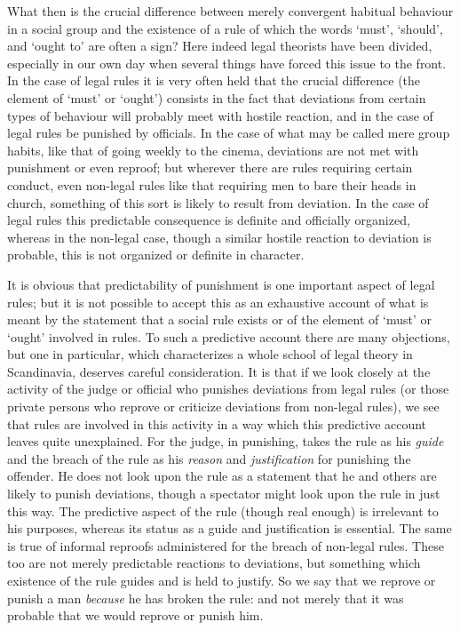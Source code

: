 What then is the crucial difference between merely convergent habitual
behaviour in a social group and the existence of a rule of which the
words `must', `should', and `ought to' are often a sign? Here indeed
legal theorists have been divided, especially in our own day when
several things have forced this issue to the front. In the case of legal
rules it is very often held that the crucial difference (the element of
`must' or `ought') consists in the fact that deviations from certain
types of behaviour will probably meet with hostile reaction, and in the
case of legal rules be punished by officials. In the case of what may be
called mere group habits, like that of going weekly to the cinema,
deviations are not met with punishment or even reproof; but wherever
there are rules requiring certain conduct, even non-legal rules like
that requiring men to bare their heads in church, something of this sort
is likely to result from deviation. In the case of legal rules this
predictable consequence is definite and officially organized, whereas in
the non-legal case, though a similar hostile reaction to deviation is
probable, this is not organized or definite in character.

It is obvious that predictability of punishment is one important aspect
of legal rules; but it is not possible to accept this as an exhaustive
account of what is meant by the statement that a social rule exists or
of the element of `must' or `ought' involved in rules. To such a
predictive account there are many objections, but one in particular,
which characterizes a whole school of legal theory in Scandinavia,
deserves careful consideration. It is that if we look closely at the
activity of the judge or official who punishes deviations from legal
rules (or those private persons who reprove or criticize deviations from
non-legal rules), we see that rules are involved in this activity in a
way which this predictive account leaves quite unexplained. For the
judge, in punishing, takes the rule as his \emph{guide} and the breach
of the rule as his \emph{reason} and \emph{justification} for punishing
the offender. He does not look upon the rule as a statement that he and
others are likely to punish deviations, though a spectator might look
upon the rule in just this way. The predictive aspect of the rule
(though real enough) is irrelevant to his purposes, whereas its status
as a guide and justification is essential. The same is true of informal
reproofs administered for the breach of non-legal rules. These too are
not merely predictable reactions to deviations, but something which
existence of the rule guides and is held to justify. So we say that we
reprove or punish a man \emph{because} he has broken the rule: and not
merely that it was probable that we would reprove or punish him.

